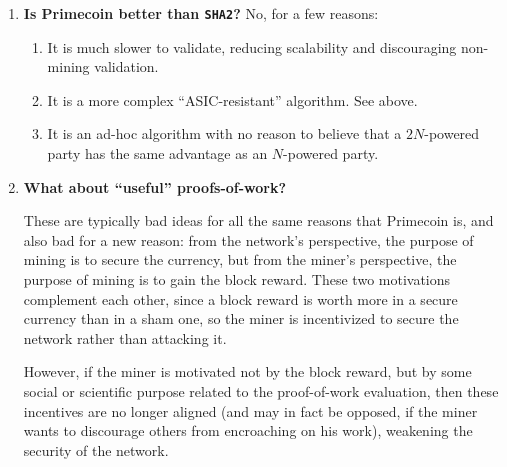 \documentclass[letterpaper]{article}
\theoremstyle{xxx}
\theoremstyle{evil}
\theoremstyle{yyy}
\theoremstyle{plain}
\theoremstyle{zzz}
\begin{document}
\begin{enumerate}
\item \textbf{Is Primecoin better than \texttt{SHA2}?}
No, for a few reasons:
\begin{enumerate}
\item It is much slower to validate, reducing scalability and discouraging
non-mining validation.
\item It is a more complex ``ASIC-resistant'' algorithm. See above.
\item It is an ad-hoc algorithm with no reason to believe that a $2N$-powered
party has the same advantage as an $N$-powered party.
\end{enumerate}

\item \textbf{What about ``useful'' proofs-of-work?}

These are typically bad ideas for all the same reasons that Primecoin is,
and also bad for a new reason: from the network's perspective, the purpose
of mining is to secure the currency, but from the miner's perspective, the
purpose of mining is to gain the block reward. These two motivations
complement each other, since a block reward is worth more in a secure
currency than in a sham one, so the miner is incentivized to secure the
network rather than attacking it.

However, if the miner is motivated not by the block reward, but by some
social or scientific purpose related to the proof-of-work evaluation,
then these incentives are no longer aligned (and may in fact be opposed,
if the miner wants to discourage others from encroaching on his work),
weakening the security of the network.

\end{enumerate}
\end{document}
